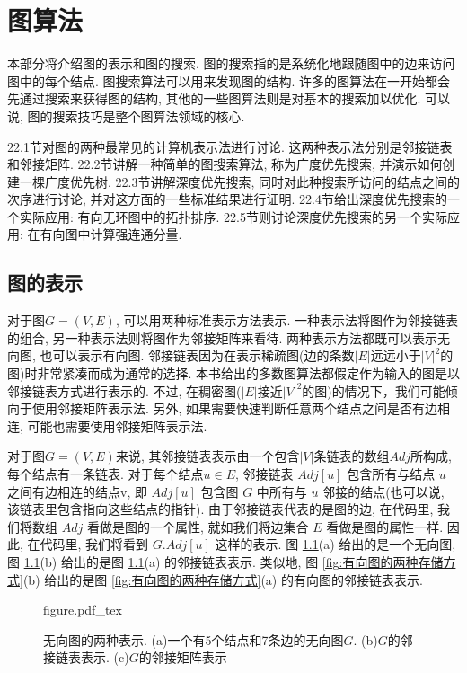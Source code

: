 \documentclass[oneside,10pt,fontset=none]{ctexbook}
\numberwithin{definition}{chapter}
\numberwithin{theorem}{chapter}
\numberwithin{lemma}{chapter}
\begin{document}
\part{图算法}

本部分将介绍图的表示和图的搜索. 图的搜索指的是系统化地跟随图中的边来访问图中的每个结点. 图搜索算法可以用来发现图的结构. 许多的图算法在一开始都会先通过搜索来获得图的结构, 其他的一些图算法则是对基本的搜索加以优化. 可以说, 图的搜索技巧是整个图算法领域的核心.

22.1节对图的两种最常见的计算机表示法进行讨论. 这两种表示法分别是邻接链表和邻接矩阵. 22.2节讲解一种简单的图搜索算法, 称为广度优先搜索, 并演示如何创建一棵广度优先树. 22.3节讲解深度优先搜索, 同时对此种搜索所访问的结点之间的次序进行讨论, 并对这方面的一些标准结果进行证明. 22.4节给出深度优先搜索的一个实际应用: 有向无环图中的拓扑排序. 22.5节则讨论深度优先搜索的另一个实际应用: 在有向图中计算强连通分量.

\chapter{图的表示}

对于图$G=(V,E)$, 可以用两种标准表示方法表示. 一种表示法将图作为邻接链表的组合, 另一种表示法则将图作为邻接矩阵来看待. 两种表示方法都既可以表示无向图, 也可以表示有向图. 邻接链表因为在表示稀疏图(边的条数$|E|$远远小于$|V|^2$的图)时非常紧凑而成为通常的选择. 本书给出的多数图算法都假定作为输入的图是以邻接链表方式进行表示的. 不过, 在稠密图($|E|$接近$|V|^2$的图)的情况下，我们可能倾向于使用邻接矩阵表示法. 另外, 如果需要快速判断任意两个结点之间是否有边相连, 可能也需要使用邻接矩阵表示法.

对于图$G=(V,E)$来说, 其邻接链表表示由一个包含$|V|$条链表的数组$Adj$所构成, 每个结点有一条链表. 对于每个结点$u\in E$, 邻接链表 $Adj[u]$ 包含所有与结点 $u$ 之间有边相连的结点v, 即 $Adj[u]$ 包含图 $G$ 中所有与 $u$ 邻接的结点(也可以说, 该链表里包含指向这些结点的指针). 由于邻接链表代表的是图的边, 在代码里, 我们将数组 $Adj$ 看做是图的一个属性, 就如我们将边集合 $E$ 看做是图的属性一样. 因此, 在代码里, 我们将看到 $G.Adj[u]$ 这样的表示. 图 \ref{fig:无向图的两种存储方式}(a) 给出的是一个无向图, 图 \ref{fig:无向图的两种存储方式}(b) 给出的是图 \ref{fig:无向图的两种存储方式}(a) 的邻接链表表示. 类似地, 图 \ref{fig:有向图的两种存储方式}(b) 给出的是图 \ref{fig:有向图的两种存储方式}(a) 的有向图的邻接链表表示.

\begin{figure}[htbp]
    \def\svgwidth{\columnwidth}
    {figure.pdf_tex}
    \caption{无向图的两种表示. (a)一个有5个结点和7条边的无向图$G$. (b)$G$的邻接链表表示. (c)$G$的邻接矩阵表示}
    \label{fig:无向图的两种存储方式}
\end{figure}
\end{document}
